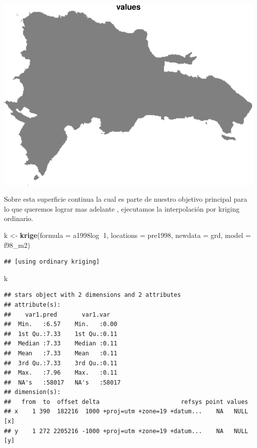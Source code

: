\documentclass[11pt,]{article}
\newenvironment{Shaded}{\begin{snugshade}}{\end{snugshade}}
\newcommand{\KeywordTok}[1]{\textcolor[rgb]{0.13,0.29,0.53}{\textbf{#1}}}
\newcommand{\DataTypeTok}[1]{\textcolor[rgb]{0.13,0.29,0.53}{#1}}
\newcommand{\DecValTok}[1]{\textcolor[rgb]{0.00,0.00,0.81}{#1}}
\newcommand{\StringTok}[1]{\textcolor[rgb]{0.31,0.60,0.02}{#1}}
\newcommand{\OperatorTok}[1]{\textcolor[rgb]{0.81,0.36,0.00}{\textbf{#1}}}
\newcommand{\NormalTok}[1]{#1}
\begin{document}
\includegraphics{proyecto_Superficie_Continua_files/figure-latex/unnamed-chunk-9-1.pdf}

Sobre esta superficie continua la cual es parte de nuestro objetivo
principal para lo que queremos lograr mas adelante , ejecutamos la
interpolación por kriging ordinario.

\begin{Shaded}
\begin{Highlighting}[]
\NormalTok{k <-}\StringTok{ }\KeywordTok{krige}\NormalTok{(}\DataTypeTok{formula =}\NormalTok{ a1998log}\OperatorTok{~}\DecValTok{1}\NormalTok{, }\DataTypeTok{locations =}\NormalTok{ pre1998, }\DataTypeTok{newdata =}\NormalTok{ grd, }\DataTypeTok{model =}\NormalTok{ f98_m2)}
\end{Highlighting}
\end{Shaded}

\begin{verbatim}
## [using ordinary kriging]
\end{verbatim}

\begin{Shaded}
\begin{Highlighting}[]
\NormalTok{k}
\end{Highlighting}
\end{Shaded}

\begin{verbatim}
## stars object with 2 dimensions and 2 attributes
## attribute(s):
##    var1.pred       var1.var     
##  Min.   :6.57    Min.   :0.00   
##  1st Qu.:7.33    1st Qu.:0.11   
##  Median :7.33    Median :0.11   
##  Mean   :7.33    Mean   :0.11   
##  3rd Qu.:7.33    3rd Qu.:0.11   
##  Max.   :7.96    Max.   :0.11   
##  NA's   :58017   NA's   :58017  
## dimension(s):
##   from  to  offset delta                       refsys point values    
## x    1 390  182216  1000 +proj=utm +zone=19 +datum...    NA   NULL [x]
## y    1 272 2205216 -1000 +proj=utm +zone=19 +datum...    NA   NULL [y]
\end{verbatim}
\end{document}
